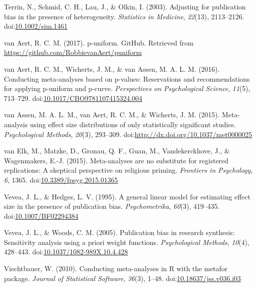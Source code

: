 \documentclass[english,man]{apa6}
\theoremstyle{definition}
\theoremstyle{definition}
\theoremstyle{definition}
\theoremstyle{remark}
\begin{document}
\hypertarget{ref-Terrin2003}{}
Terrin, N., Schmid, C. H., Lau, J., \& Olkin, I. (2003). Adjusting for
publication bias in the presence of heterogeneity. \emph{Statistics in
Medicine}, \emph{22}(13), 2113--2126.
doi:\href{https://doi.org/10.1002/sim.1461}{10.1002/sim.1461}

\hypertarget{ref-VanAert2017}{}
van Aert, R. C. M. (2017). p-uniform. GitHub. Retrieved from
\url{https://github.com/RobbievanAert/puniform}

\hypertarget{ref-VanAert2016}{}
van Aert, R. C. M., Wicherts, J. M., \& van Assen, M. A. L. M. (2016).
Conducting meta-analyses based on p-values: Reservations and
recommendations for applying p-uniform and p-curve. \emph{Perspectives
on Psychological Science}, \emph{11}(5), 713--729.
doi:\href{https://doi.org/10.1017/CBO9781107415324.004}{10.1017/CBO9781107415324.004}

\hypertarget{ref-VanAssen2015}{}
van Assen, M. A. L. M., van Aert, R. C. M., \& Wicherts, J. M. (2015).
Meta-analysis using effect size distributions of only statistically
significant studies. \emph{Psychological Methods}, \emph{20}(3),
293--309.
doi:\href{https://doi.org/http://dx.doi.org/10.1037/met0000025}{http://dx.doi.org/10.1037/met0000025}

\hypertarget{ref-VanElk2015}{}
van Elk, M., Matzke, D., Gronau, Q. F., Guan, M., Vandekerckhove, J., \&
Wagenmakers, E.-J. (2015). Meta-analyses are no substitute for
registered replications: A skeptical perspective on religious priming.
\emph{Frontiers in Psychology}, \emph{6}, 1365.
doi:\href{https://doi.org/10.3389/fpsyg.2015.01365}{10.3389/fpsyg.2015.01365}

\hypertarget{ref-Vevea1995}{}
Vevea, J. L., \& Hedges, L. V. (1995). A general linear model for
estimating effect size in the presence of publication bias.
\emph{Psychometrika}, \emph{60}(3), 419--435.
doi:\href{https://doi.org/10.1007/BF02294384}{10.1007/BF02294384}

\hypertarget{ref-Vevea2005}{}
Vevea, J. L., \& Woods, C. M. (2005). Publication bias in research
synthesis: Sensitivity analysis using a priori weight functions.
\emph{Psychological Methods}, \emph{10}(4), 428--443.
doi:\href{https://doi.org/10.1037/1082-989X.10.4.428}{10.1037/1082-989X.10.4.428}

\hypertarget{ref-Viechtbauer2010}{}
Viechtbauer, W. (2010). Conducting meta-analyses in R with the metafor
package. \emph{Journal of Statistical Software}, \emph{36}(3), 1--48.
doi:\href{https://doi.org/10.18637/jss.v036.i03}{10.18637/jss.v036.i03}
\end{document}
